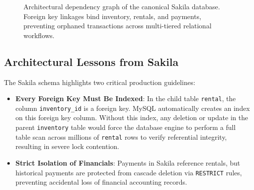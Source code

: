 \documentclass[10pt,journal,compsoc,onecolumn]{IEEEtran}
\begin{document}
\begin{figure}[htbp]
\centering
{}
\caption{Architectural dependency graph of the canonical Sakila database. Foreign key linkages bind inventory, rentals, and payments, preventing orphaned transactions across multi-tiered relational workflows.}
\label{fig:sakila_graph}
\end{figure}

\subsection{Architectural Lessons from Sakila}
The Sakila schema highlights two critical production guidelines:
\begin{itemize}
    \item \textbf{Every Foreign Key Must Be Indexed}: In the child table \texttt{rental}, the column \texttt{inventory\_id} is a foreign key. MySQL automatically creates an index on this foreign key column. Without this index, any deletion or update in the parent \texttt{inventory} table would force the database engine to perform a full table scan across millions of \texttt{rental} rows to verify referential integrity, resulting in severe lock contention.
    \item \textbf{Strict Isolation of Financials}: Payments in Sakila reference rentals, but historical payments are protected from cascade deletion via \texttt{RESTRICT} rules, preventing accidental loss of financial accounting records.
\end{itemize}
\end{document}
